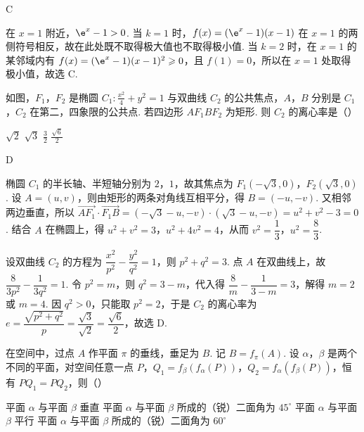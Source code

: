 \begin{answer}
C
\end{answer}

\begin{solution}
在 \(x=1\) 附近，\(\e^{x}-1>0\). 当 \(k=1\) 时，\(f(x)=(\e^{x}-1)(x-1)\) 在 \(x=1\) 的两侧符号相反，故在此处既不取得极大值也不取得极小值. 当 \(k=2\) 时，在 \(x=1\) 的某邻域内有 \(f(x)=(\e^{x}-1)(x-1)^{2}\geqslant0\)，且 \(f(1)=0\)，所以在 \(x=1\) 处取得极小值，故选 C.
\end{solution}

\begin{problem}
如图，\(F_{1}\)，\(F_{2}\) 是椭圆 \(C_{1}: \frac{x^{2}}{4} + y^{2} = 1\) 与双曲线 \(C_{2}\) 的公共焦点，\(A\)，\(B\) 分别是 \(C_{1}\)，\(C_{2}\) 在第二，四象限的公共点. 若四边形 \(AF_{1}BF_{2}\) 为矩形. 则 \(C_{2}\) 的离心率是（\quad）


\choices
    {\(\sqrt{2}\)}
    {\(\sqrt{3}\)}
    {\( \frac{3}{2} \)}
    {\(\frac{\sqrt{6}}{2}\)}
\end{problem}

\begin{answer}
D
\end{answer}

\begin{solution}
椭圆 \(C_{1}\) 的半长轴、半短轴分别为 \(2\)，\(1\)，故其焦点为 \(F_{1}(-\sqrt{3},0)\)，\(F_{2}(\sqrt{3},0)\). 设 \(A=(u,v)\)，则由矩形的两条对角线互相平分，得 \(B=(-u,-v)\). 又相邻两边垂直，所以
\(\overrightarrow{AF_{1}}\cdot\overrightarrow{F_{1}B}=(-\sqrt{3}-u,-v)\cdot(\sqrt{3}-u,-v)=u^{2}+v^{2}-3=0\). 结合 \(A\) 在椭圆上，得 \(u^{2}+v^{2}=3\)，\(u^{2}+4v^{2}=4\)，从而 \(v^{2}=\dfrac{1}{3}\)，\(u^{2}=\dfrac{8}{3}\).

设双曲线 \(C_{2}\) 的方程为 \(\dfrac{x^{2}}{p^{2}}-\dfrac{y^{2}}{q^{2}}=1\)，则 \(p^{2}+q^{2}=3\). 点 \(A\) 在双曲线上，故 \(\dfrac{8}{3p^{2}}-\dfrac{1}{3q^{2}}=1\). 令 \(p^{2}=m\)，则 \(q^{2}=3-m\)，代入得 \(\dfrac{8}{m}-\dfrac{1}{3-m}=3\)，解得 \(m=2\) 或 \(m=4\). 因 \(q^{2}>0\)，只能取 \(p^{2}=2\)，于是 \(C_{2}\) 的离心率为 \(e=\dfrac{\sqrt{p^{2}+q^{2}}}{p}=\dfrac{\sqrt{3}}{\sqrt{2}}=\dfrac{\sqrt{6}}{2}\)，故选 D.
\end{solution}

\begin{problem}
在空间中，过点 \(A\) 作平面 \(\pi\) 的垂线，垂足为 \(B\). 记 \(B = f_{\pi}(A)\). 设 \(\alpha\)，\(\beta\) 是两个不同的平面，对空间任意一点 \(P\)，\(Q_1 = f_{\beta}(f_{\alpha}(P))\)，\(Q_2 = f_{\alpha}(f_{\beta}(P))\)，恒有 \(PQ_1 = PQ_2\)，则（\quad）

\choices
    {平面 \(\alpha\) 与平面 \(\beta\) 垂直}
    {平面 \(\alpha\) 与平面 \(\beta\) 所成的（锐）二面角为 \(45^{\circ}\)}
    {平面 \(\alpha\) 与平面 \(\beta\) 平行}
    {平面 \(\alpha\) 与平面 \(\beta\) 所成的（锐）二面角为 \(60^{\circ}\)}
\end{problem}

